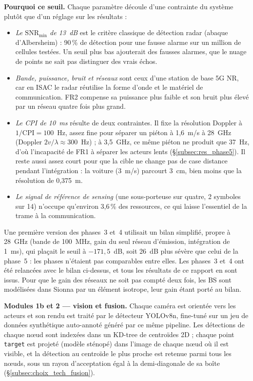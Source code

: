 \documentclass[12pt,a4paper,titlepage]{article}
\begin{document}
\textbf{Pourquoi ce seuil.} Chaque paramètre découle d'une contrainte du système plutôt que d'un réglage sur les résultats :
\begin{itemize}[leftmargin=1.5em]
    \item \emph{Le $\mathrm{SNR}_{\min}$ de 13~dB} est le critère classique de détection radar (abaque d'Albersheim) : 90\,\% de détection pour une fausse alarme sur un million de cellules testées. Un seuil plus bas ajouterait des fausses alarmes, que le nuage de points ne sait pas distinguer des vrais échos.
    \item \emph{Bande, puissance, bruit et réseaux} sont ceux d'une station de base 5G NR, car en ISAC le radar réutilise la forme d'onde et le matériel de communication. FR2 compense sa puissance plus faible et son bruit plus élevé par un réseau quatre fois plus grand.
    \item \emph{Le CPI de 10~ms} résulte de deux contraintes. Il fixe la résolution Doppler à $1/\mathrm{CPI} = 100$~Hz, assez fine pour séparer un piéton à 1,6~m/s à 28~GHz (Doppler $2v/\lambda \approx 300$~Hz) ; à 3,5~GHz, ce même piéton ne produit que 37~Hz, d'où l'incapacité de FR1 à séparer les acteurs lents (\S\ref{subsec:res_phase5}). Il reste aussi assez court pour que la cible ne change pas de case distance pendant l'intégration : la voiture (3~m/s) parcourt 3~cm, bien moins que la résolution de 0,375~m.
    \item \emph{Le signal de référence de sensing} (une sous-porteuse sur quatre, 2 symboles sur 14) n'occupe qu'environ 3,6\,\% des ressources, ce qui laisse l'essentiel de la trame à la communication.
\end{itemize}
Une première version des phases~3 et~4 utilisait un bilan simplifié, propre à 28~GHz (bande de 100~MHz, gain du seul réseau d'émission, intégration de 1~ms), qui plaçait le seuil à $-171{,}5$~dB, soit 26~dB plus sévère que celui de la phase~5 : les phases n'étaient pas comparables entre elles. Les phases~3 et~4 ont été relancées avec le bilan ci-dessus, et tous les résultats de ce rapport en sont issus. Pour que le gain des réseaux ne soit pas compté deux fois, les BS sont modélisées dans Sionna par un élément isotrope, leur gain étant porté au bilan.

\textbf{Modules 1b et 2 --- vision et fusion.} Chaque caméra est orientée vers les acteurs et son rendu est traité par le détecteur YOLOv8n, fine-tuné sur un jeu de données synthétique auto-annoté généré par ce même pipeline. Les détections de chaque n\oe ud sont indexées dans un KD-tree de centroïdes 2D ; chaque point \texttt{target} est projeté (modèle sténopé) dans l'image de chaque n\oe ud où il est visible, et la détection au centroïde le plus proche est retenue parmi tous les n\oe uds, sous un rayon d'acceptation égal à la demi-diagonale de sa boîte (\S\ref{subsec:choix_tech_fusion}).
\end{document}
